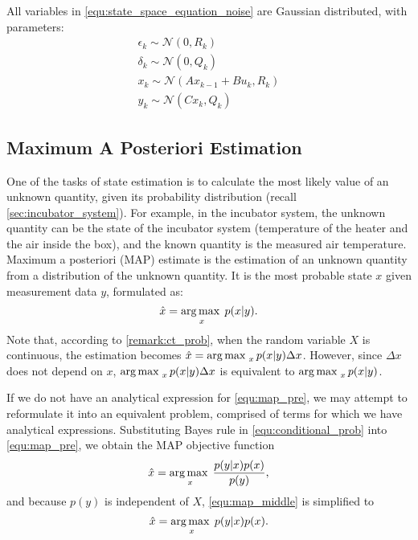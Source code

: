 \begin{remark}\label{rem:distributions}
	All variables in \cref{equ:state_space_equation_noise} are Gaussian distributed, with parameters:
	\begin{equation}
		\begin{split}
			\epsilon_k \sim \mathcal{N}(0,R_k)\\
			\delta_k \sim \mathcal{N}(0,Q_k)\\
			x_k \sim \mathcal{N}(Ax_{k-1}+Bu_k,R_k)\\
			y_k \sim \mathcal{N}(Cx_k,Q_k)
		\end{split}
	\end{equation}
\end{remark}




\subsection{Maximum A Posteriori Estimation}
\label{sec:map}

One of the tasks of state estimation is to calculate the most likely value of an unknown quantity, given its probability distribution (recall \cref{sec:incubator_system}).
For example, in the incubator system, the unknown quantity can be the state of the incubator system (temperature of the heater and the air inside the box), and the known quantity is the measured air temperature.
Maximum a posteriori (MAP) estimate is the estimation of an unknown quantity from a distribution of the unknown quantity. 
It is the most probable state $x$ given measurement data $y$, formulated as:
\begin{equation} \label{equ:map_pre}
	\hat{x} = \operatorname*{arg\,max\;}_{x} p(x|y).
\end{equation}
Note that, according to \cref{remark:ct_prob}, when the random variable $X$ is continuous, the estimation becomes $\hat{x} = \operatorname*{arg\,max\;}_{x} p(x|y)\Delta x$.
However, since $\Delta x$ does not depend on $x$, $\operatorname*{arg\,max\;}_{x} p(x|y)\Delta x$ is equivalent to $\operatorname*{arg\,max\;}_{x} p(x|y)$.

If we do not have an analytical expression for \cref{equ:map_pre}, we may attempt to reformulate it into an equivalent problem, comprised of terms for which we have analytical expressions.
Substituting Bayes rule in \cref{equ:conditional_prob} into \cref{equ:map_pre}, we obtain the MAP objective function
\begin{equation} \label{equ:map_middle}
	\hat{x} = \operatorname*{arg\,max\;}_{x} \frac{p(y|x)p(x)}{p(y)},
\end{equation}
and because $p(y)$ is independent of $X$, \cref{equ:map_middle} is simplified to
\begin{equation} \label{equ:map}
	\hat{x} = \operatorname*{arg\,max\;}_{x} p(y|x) p(x).
\end{equation} 

